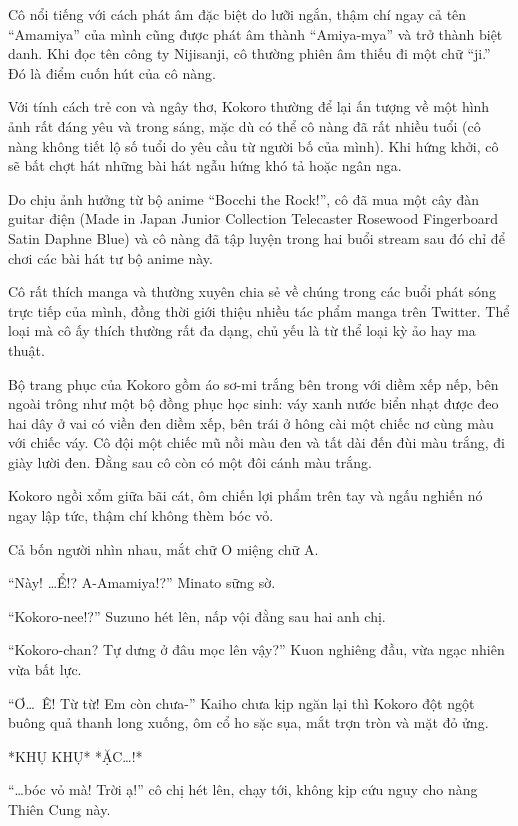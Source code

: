 \documentclass[../main.tex]{subfiles}
\begin{document}
Cô nổi tiếng với cách phát âm đặc biệt do lưỡi ngắn, thậm chí ngay cả tên ``Amamiya'' của mình cũng được phát âm thành ``Amiya-mya'' và trở thành biệt danh. Khi đọc tên công ty Nijisanji, cô thường phiên âm thiếu đi một chữ ``ji.'' Đó là điểm cuốn hút của cô nàng.

Với tính cách trẻ con và ngây thơ, Kokoro thường để lại ấn tượng về một hình ảnh rất đáng yêu và trong sáng, mặc dù có thể cô nàng đã rất nhiều tuổi (cô nàng không tiết lộ số tuổi do yêu cầu từ người bố của mình). Khi hứng khởi, cô sẽ bất chợt hát những bài hát ngẫu hứng khó tả hoặc ngân nga.

Do chịu ảnh hưởng từ bộ anime ``Bocchi the Rock!'', cô đã mua một cây đàn guitar điện (Made in Japan Junior Collection Telecaster Rosewood Fingerboard Satin Daphne Blue) và cô nàng đã tập luyện trong hai buổi stream sau đó chỉ để chơi các bài hát tư bộ anime này.

Cô rất thích manga và thường xuyên chia sẻ về chúng trong các buổi phát sóng trực tiếp của mình, đồng thời giới thiệu nhiều tác phẩm manga trên Twitter. Thể loại mà cô ấy thích thường rất đa dạng, chủ yếu là từ thể loại kỳ ảo hay ma thuật.

Bộ trang phục của Kokoro gồm áo sơ-mi trắng bên trong với diềm xếp nếp, bên ngoài trông như một bộ đồng phục học sinh: váy xanh nước biển nhạt được đeo hai dây ở vai có viền đen diềm xếp, bên trái ở hông cài một chiếc nơ cùng màu với chiếc váy. Cô đội một chiếc mũ nồi màu đen và tất dài đến đùi màu trắng, đi giày lười đen. Đằng sau cô còn có một đôi cánh màu trắng.

\chrint

Kokoro ngồi xổm giữa bãi cát, ôm chiến lợi phẩm trên tay và ngấu nghiến nó ngay lập tức, thậm chí không thèm bóc vỏ.

Cả bốn người nhìn nhau, mắt chữ O miệng chữ A.

``Này! \dots Ể!? A-Amamiya!?'' Minato sững sờ.

``Kokoro-nee!?'' Suzuno hét lên, nấp vội đằng sau hai anh chị.

``Kokoro-chan? Tự dưng ở đâu mọc lên vậy?'' Kuon nghiêng đầu, vừa ngạc nhiên vừa bất lực.

``Ơ\dots\ Ê! Từ từ! Em còn chưa-'' Kaiho chưa kịp ngăn lại thì Kokoro đột ngột buông quả thanh long xuống, ôm cổ ho sặc sụa, mắt trợn tròn và mặt đỏ ửng.

*KHỤ KHỤ* *ẶC\dots!*

``\dots bóc vỏ mà! Trời ạ!'' cô chị hét lên, chạy tới, không kịp cứu nguy cho nàng Thiên Cung này.
\end{document}
